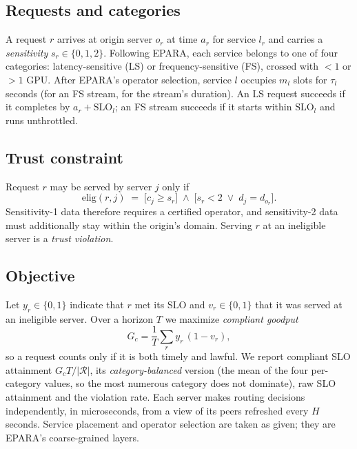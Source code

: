 \documentclass[journal]{IEEEtran}
\begin{document}
\subsection{Requests and categories}
A request $r$ arrives at origin server $o_r$ at time $a_r$ for service $l_r$ and carries a \emph{sensitivity} $s_r\in\{0,1,2\}$. Following EPARA, each service belongs to one of four categories: latency-sensitive (LS) or frequency-sensitive (FS), crossed with $<1$ or $>1$ GPU. After EPARA's operator selection, service $l$ occupies $m_l$ slots for $\tau_l$ seconds (for an FS stream, for the stream's duration). An LS request succeeds if it completes by $a_r+\mathrm{SLO}_l$; an FS stream succeeds if it starts within $\mathrm{SLO}_l$ and runs unthrottled.

\subsection{Trust constraint}
Request $r$ may be served by server $j$ only if
\begin{equation}
\mathrm{elig}(r,j)\;=\;\big[c_j\ge s_r\big]\;\wedge\;\big[s_r<2\;\vee\;d_j=d_{o_r}\big].\label{eq:elig}
\end{equation}
Sensitivity-1 data therefore requires a certified operator, and sensitivity-2 data must additionally stay within the origin's domain. Serving $r$ at an ineligible server is a \emph{trust violation}.

\subsection{Objective}
Let $y_r\in\{0,1\}$ indicate that $r$ met its SLO and $v_r\in\{0,1\}$ that it was served at an ineligible server. Over a horizon $T$ we maximize \emph{compliant goodput}
\begin{equation}
G_c=\frac{1}{T}\sum_{r}y_r\,(1-v_r),\label{eq:obj}
\end{equation}
so a request counts only if it is both timely and lawful. We report compliant SLO attainment $G_cT/|\mathcal{R}|$, its \emph{category-balanced} version (the mean of the four per-category values, so the most numerous category does not dominate), raw SLO attainment and the violation rate. Each server makes routing decisions independently, in microseconds, from a view of its peers refreshed every $H$ seconds. Service placement and operator selection are taken as given; they are EPARA's coarse-grained layers.

\end{document}
